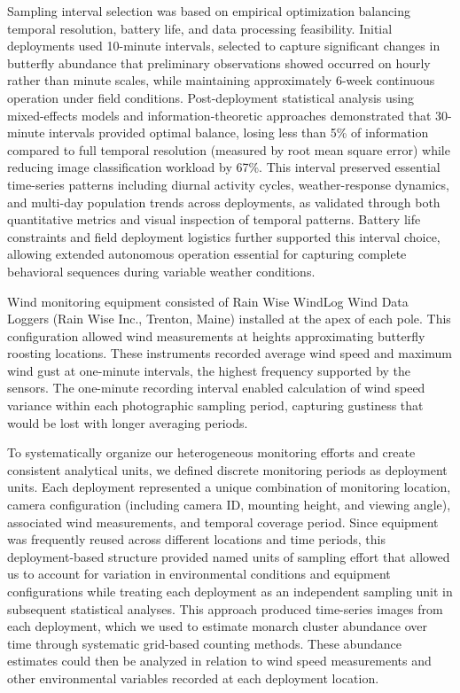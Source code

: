 Sampling interval selection was based on empirical optimization balancing temporal resolution, battery life, and data processing feasibility. Initial deployments used 10-minute intervals, selected to capture significant changes in butterfly abundance that preliminary observations showed occurred on hourly rather than minute scales, while maintaining approximately 6-week continuous operation under field conditions. Post-deployment statistical analysis using mixed-effects models and information-theoretic approaches demonstrated that 30-minute intervals provided optimal balance, losing less than 5\% of information compared to full temporal resolution (measured by root mean square error) while reducing image classification workload by 67\%. This interval preserved essential time-series patterns including diurnal activity cycles, weather-response dynamics, and multi-day population trends across deployments, as validated through both quantitative metrics and visual inspection of temporal patterns. Battery life constraints and field deployment logistics further supported this interval choice, allowing extended autonomous operation essential for capturing complete behavioral sequences during variable weather conditions.

Wind monitoring equipment consisted of Rain Wise WindLog Wind Data Loggers (Rain Wise Inc., Trenton, Maine) installed at the apex of each pole. This configuration allowed wind measurements at heights approximating butterfly roosting locations. These instruments recorded average wind speed and maximum wind gust at one-minute intervals, the highest frequency supported by the sensors. The one-minute recording interval enabled calculation of wind speed variance within each photographic sampling period, capturing gustiness that would be lost with longer averaging periods. 

To systematically organize our heterogeneous monitoring efforts and create consistent analytical units, we defined discrete monitoring periods as deployment units. Each deployment represented a unique combination of monitoring location, camera configuration (including camera ID, mounting height, and viewing angle), associated wind measurements, and temporal coverage period. Since equipment was frequently reused across different locations and time periods, this deployment-based structure provided named units of sampling effort that allowed us to account for variation in environmental conditions and equipment configurations while treating each deployment as an independent sampling unit in subsequent statistical analyses. This approach produced time-series images from each deployment, which we used to estimate monarch cluster abundance over time through systematic grid-based counting methods. These abundance estimates could then be analyzed in relation to wind speed measurements and other environmental variables recorded at each deployment location.

